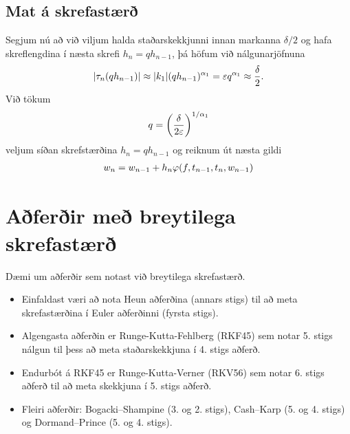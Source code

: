 \documentclass[letterpaper,10pt,icelandic]{sphinxmanual}
\begin{document}
\subsection{Mat á skrefastærð}
\label{kafli06:mat-a-skrefastaer}
Segjum nú að við viljum halda staðarskekkjunni innan markanna
\(\delta/2\) og hafa skreflengdina í næsta skrefi
\(h_{n}=qh_{n-1}\), þá höfum við nálgunarjöfnuna
\begin{gather}
\begin{split}|\tau_n(qh_{n-1})|\approx |k_1|(qh_{n-1})^{\alpha_1}=
\varepsilon {q^{\alpha_1}} \approx  \frac{\delta} 2.\end{split}\notag
\end{gather}
Við tökum
\begin{gather}
\begin{split}q = \left(\frac{\delta}{2\varepsilon}\right)^{1/{\alpha_1}}\end{split}\notag
\end{gather}
veljum síðan skrefstærðina \(h_n = qh_{n-1}\) og reiknum út næsta
gildi
\begin{gather}
\begin{split}w_{n} = w_{n-1} + h_n\varphi(f,t_{n-1},t_n,w_{n-1})\end{split}\notag
\end{gather}

\section{Aðferðir með breytilega skrefastærð}
\label{kafli06:index-14}\label{kafli06:aferir-me-breytilega-skrefastaer}
Dæmi um aðferðir sem notast við breytilega skrefastærð.
\begin{itemize}
\item {} 
Einfaldast væri að nota Heun aðferðina (annars stigs) til að meta
skrefastærðina í Euler aðferðinni (fyrsta stigs).

\item {} 
Algengasta aðferðin er Runge-Kutta-Fehlberg (RKF45) sem notar
5. stigs nálgun til þess að meta staðarskekkjuna í 4. stigs aðferð.

\item {} 
Endurbót á RKF45 er Runge-Kutta-Verner (RKV56) sem notar 6. stigs
aðferð til að meta skekkjuna í 5. stigs aðferð.

\item {} 
Fleiri aðferðir: Bogacki–Shampine (3. og 2. stigs), Cash–Karp (5. og
4. stigs) og Dormand–Prince (5. og 4. stigs).

\end{itemize}
\end{document}
